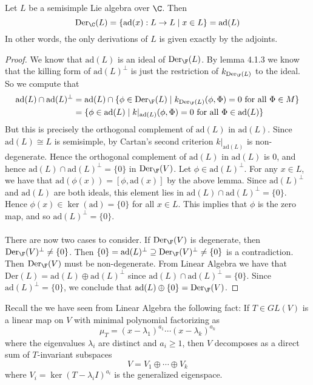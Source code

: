 \documentclass[a4paper]{article}
\begin{document}
\begin{prp}{}{} Let $L$ be a semisimple Lie algebra over $\C$. Then $$\text{Der}_\C(L)=\{\text{ad}(x):L\to L\;|\;x\in L\}=\text{ad}(L)$$ In other words, the only derivations of $L$ is given exactly by the adjoints. \tcbline
\begin{proof}
We know that $\text{ad}(L)$ is an ideal of $\text{Der}_\F(L)$. By lemma 4.1.3 we know that the killing form of $\text{ad}(L)^\perp$ is just the restriction of $k_{\text{Der}_\F(L)}$ to the ideal. So we compute that 
\begin{align*}
\text{ad}(L)\cap\text{ad}(L)^\perp&=\text{ad}(L)\cap\{\phi\in\text{Der}_\F(L)\;|\;k_{\text{Der}_\F(L)}(\phi,\Phi)=0\text{ for all }\Phi\in M\}\\
&=\{\phi\in\text{ad}(L)\;|\;k|_{\text{ad}(L)}(\phi,\Phi)=0\text{ for all }\Phi\in\text{ad}(L)\}
\end{align*}
But this is precisely the orthogonal complement of $\text{ad}(L)$ in $\text{ad}(L)$. Since $\text{ad}(L)\cong L$ is semisimple, by Cartan's second criterion $k|_{\text{ad}(L)}$ is non-degenerate. Hence the orthogonal complement of $\text{ad}(L)$ in $\text{ad}(L)$ is $0$, and hence $\text{ad}(L)\cap\text{ad}(L)^\perp=\{0\}$ in $\text{Der}_\F(V)$. Let $\phi\in\text{ad}(L)^\perp$. For any $x\in L$, we have that $\text{ad}(\phi(x))=[\phi,\text{ad}(x)]$ by the above lemma. Since $\text{ad}(L)^\perp$ and $\text{ad}(L)$ are both ideals, this element lies in $\text{ad}(L)\cap\text{ad}(L)^\perp=\{0\}$. Hence $\phi(x)\in\ker(\text{ad})=\{0\}$ for all $x\in L$. This implies that $\phi$ is the zero map, and so $\text{ad}(L)^\perp=\{0\}$. \\~\\

There are now two cases to consider. If $\text{Der}_\F(V)$ is degenerate, then $\text{Der}_\F(V)^\perp\neq\{0\}$. Then $\{0\}=\text{ad}(L)^\perp\supseteq\text{Der}_\F(V)^\perp\neq\{0\}$ is a contradiction. Then $\text{Der}_\F(V)$ must be non-degenerate. From Linear Algebra we have that $\text{Der}(L)=\text{ad}(L)\oplus\text{ad}(L)^\perp$ since $\text{ad}(L)\cap\text{ad}(L)^\perp=\{0\}$. Since $\text{ad}(L)^\perp=\{0\}$, we conclude that $\text{ad}(L)\oplus\{0\}=\text{Der}_\F(V)$. 
\end{proof}
\end{prp}

Recall the we have seen from Linear Algebra the following fact: If $T\in GL(V)$ is a linear map on $V$ with minimal polynomial factorizing as $$\mu_T=(x-\lambda_1)^{a_1}\cdots(x-\lambda_k)^{a_k}$$ where the eigenvalues $\lambda_i$ are distinct and $a_i\geq 1$, then $V$ decomposes as a direct sum of $T$-invariant subspaces $$V=V_1\oplus\cdots\oplus V_k$$ where $V_i=\ker(T-\lambda_i I)^{a_i}$ is the generalized eigenspace. 
\end{document}
